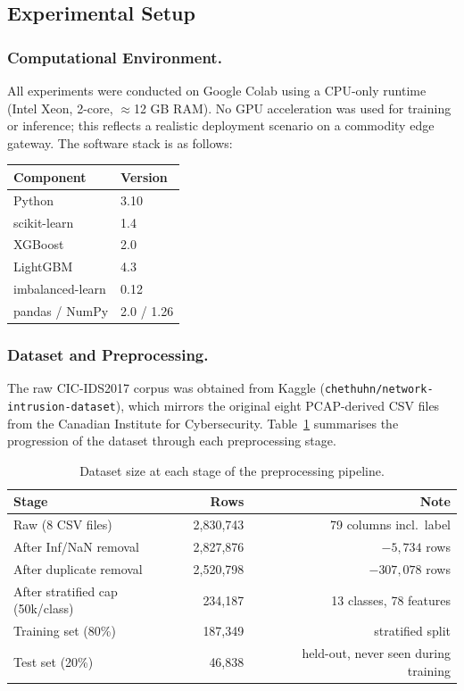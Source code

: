 \subsection{Experimental Setup}
\label{sec:exp-setup}

\subsubsection*{Computational Environment.}
All experiments were conducted on Google Colab using a CPU-only runtime (Intel Xeon, 2-core, $\approx$12 GB RAM). No GPU acceleration was used for training or inference; this reflects a realistic deployment scenario on a commodity edge gateway. The software stack is as follows:

\begin{center}
\begin{tabular}{ll}
\toprule
\textbf{Component} & \textbf{Version} \\
\midrule
Python             & 3.10 \\
scikit-learn       & 1.4 \\
XGBoost            & 2.0 \\
LightGBM           & 4.3 \\
imbalanced-learn   & 0.12 \\
pandas / NumPy     & 2.0 / 1.26 \\
\bottomrule
\end{tabular}
\end{center}

\subsubsection*{Dataset and Preprocessing.}
The raw CIC-IDS2017 corpus was obtained from Kaggle
(\texttt{chethuhn/network-intrusion-dataset}), which mirrors the original eight PCAP-derived CSV files from the Canadian Institute for Cybersecurity.
Table~\ref{tab:data-pipeline} summarises the progression of the dataset through each preprocessing stage.

\begin{table}[h]
\centering
\caption{Dataset size at each stage of the preprocessing pipeline.}
\label{tab:data-pipeline}
\begin{tabular}{lrr}
\toprule
\textbf{Stage} & \textbf{Rows} & \textbf{Note} \\
\midrule
Raw (8 CSV files)              & 2,830,743 & 79 columns incl.\ label \\
After Inf/NaN removal          & 2,827,876 & $-5{,}734$ rows \\
After duplicate removal        & 2,520,798 & $-307{,}078$ rows \\
After stratified cap (50k/class) & 234,187 & 13 classes, 78 features \\
\midrule
Training set (80\%)            & 187,349   & stratified split \\
Test set (20\%)                & 46,838    & held-out, never seen during training \\
\bottomrule
\end{tabular}
\end{table}


